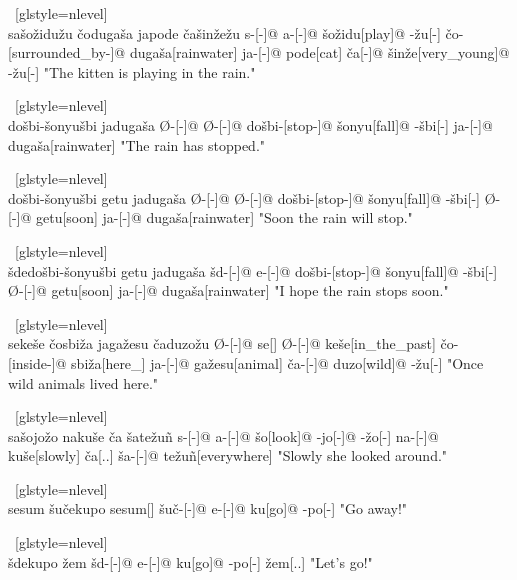 \ex~[glstyle=nlevel]
\begingl
\glpreamble {} \\ sašožidužu čodugaša japode čašinžežu
\endpreamble
s-[{\Ind}-]@
a-[{\Prog}-]@
šožidu[play]@
-žu[-{\An}]
čo-[surrounded\_by-]@
dugaša[rainwater]
ja-[{\Nom}-]@
pode[cat]
ča[{\Nom}-]@
šinže[very\_young]@
-žu[-{\An}]
\glft "The kitten is playing in the rain."
\endgl
\xe

\ex~[glstyle=nlevel]
\begingl 
\glpreamble {} \\ došbi-šonyušbi jadugaša
\endpreamble
Ø-[{\Ind}-]@
Ø-[{\Pfv}-]@
došbi-[stop-]@
šonyu[fall]@
-šbi[-{\Inan}]
ja-[{\Nom}-]@
dugaša[rainwater]
\glft "The rain has stopped."
\endgl
\xe

\ex~[glstyle=nlevel]
\begingl 
\glpreamble {} \\ došbi-šonyušbi getu jadugaša
\endpreamble
Ø-[{\Ind}-]@
Ø-[{\Pfv}-]@
došbi-[stop-]@
šonyu[fall]@
-šbi[-{\Inan}]
Ø-[{\Pfv}-]@
getu[soon]
ja-[{\Nom}-]@
dugaša[rainwater]
\glft "Soon the rain will stop."
\endgl
\xe

\ex~[glstyle=nlevel]
\begingl
\glpreamble {} \\ šdedošbi-šonyušbi getu jadugaša
\endpreamble
šd-[{\Opt}-]@
e-[{\Pfv}-]@
došbi-[stop-]@
šonyu[fall]@
-šbi[-{\Inan}]
Ø-[{\Pfv}-]@
getu[soon]
ja-[{\Nom}-]@
dugaša[rainwater]
\glft "I hope the rain stops soon."
\endgl
\xe

\ex~[glstyle=nlevel]
\begingl
\glpreamble {} \\ sekeše čosbiža jagažesu čaduzožu
\endpreamble
Ø-[{\Ind}-]@
se[{\Cop}]
Ø-[{\Pfv}-]@
keše[in\_the\_past]
čo-[inside-]@
sbiža[here\_]
ja-[{\Nom}-]@
gažesu[animal]
ča-[{\Nom}-]@
duzo[wild]@
-žu[-{\An}]
\glft "Once wild animals lived here."
\endgl
\xe

\ex~[glstyle=nlevel]
\begingl
\glpreamble {} \\ sašojožo nakuše ča šatežuñ
\endpreamble
s-[{\Ind}-]@
a-[{\Prog}-]@
šo[look]@
-jo[-{\Hg}]@
-žo[-{\Inan}]
na-[{\Prog}-]@
kuše[slowly]
ča[{\T}.{\Hg}.{\Erg}]
ša-[{\Acc}-]@
težuñ[everywhere]
\glft "Slowly she looked around."
\endgl
\xe

\ex~[glstyle=nlevel]
\begingl
\glpreamble {} \\ sesum šučekupo
\endpreamble
sesum[\Imp]
šuč-[{\Deo}-]@
e-[{\Pfv}-]@
ku[go]@
-po[-{\Hg}]
\glft "Go away!"
\endgl
\xe

\ex~[glstyle=nlevel]
\begingl
\glpreamble {} \\ šdekupo žem
\endpreamble
šd-[{\Opt}-]@
e-[{\Pfv}-]@
ku[go]@
-po[-{\Hg}]
žem[{\Fin}.{\Hg}.{\Nom}]
\glft "Let's go!"
\endgl
\xe

